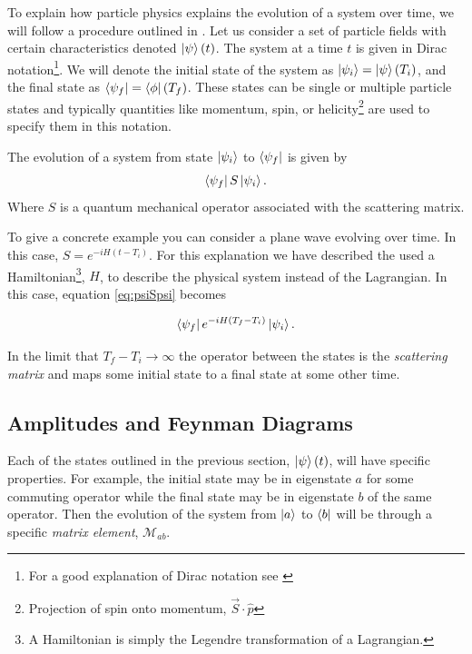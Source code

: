 To explain how particle physics explains the evolution of a system over time, we will follow a procedure outlined in \cite{Maggiore5.1:2005}. Let us consider a set of particle fields with certain characteristics denoted $\ket{\psi}\left(t\right)$. The system at a time $t$ is given in Dirac notation\footnote{For a good explanation of Dirac notation see \cite{Schwabl:2002}}. We will denote the initial state of the system as $\ket{\psi_{i}} = \ket{\psi}\left(T_{i}\right)$, and the final state as $\bra{\psi_{f}} = \bra{\phi}\left(T_{f}\right)$. These states can be single or multiple particle states and typically quantities like momentum, spin, or helicity\footnote{Projection of spin onto momentum, $\vec{S}\cdot\hat{p}$} are used to specify them in this notation.

The evolution of a system from state $\ket{\psi_{i}}$ to $\bra{\psi_{f}}$ is given by
\begin{equation}
\label{eq:psiSpsi}
\bra{\psi_{f}}S\ket{\psi_{i}}.
\end{equation}
Where $S$ is a quantum mechanical operator associated with the scattering matrix. 

To give a concrete example you can consider a plane wave evolving over time. In this case, $S = e^{-iH\left(t-T_{i}\right)}$. For this explanation we have described the used a Hamiltonian\footnote{A Hamiltonian is simply the Legendre transformation of a Lagrangian.}, $H$, to describe the physical system instead of the Lagrangian. In this case, equation \ref{eq:psiSpsi} becomes

\begin{equation}
\label{eq:WaveSmatrix}
\bra{\psi_{f}}e^{-iH\left(T_{f}-T_{i}\right)}\ket{\psi_{i}}.
\end{equation}

In the limit that $T_{f} - T_{i} \to \infty$ the operator between the states is the \textit{scattering matrix} and maps some initial state to a final state at some other time. 

\subsection{Amplitudes and Feynman Diagrams}
\label{sec:Amplitudes}

Each of the states outlined in the previous section, $\ket{\psi}\left(t\right)$, will have specific properties. For example, the initial state may be in eigenstate $a$ for some commuting operator while the final state may be in eigenstate $b$ of the same operator. Then the evolution of the system from $\ket{a}$ to $\bra{b}$ will be through a specific \textit{matrix element}, $\mathcal{M}_{ab}$.


